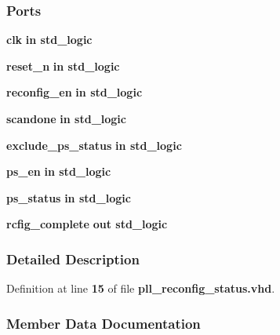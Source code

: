\subsubsection*{Ports}
 \begin{DoxyCompactItemize}
\item 
{\bf clk}  {\bfseries {\bfseries \textcolor{keywordflow}{in}\textcolor{vhdlchar}{ }}} {\bfseries \textcolor{comment}{std\+\_\+logic}\textcolor{vhdlchar}{ }} 
\item 
{\bf reset\+\_\+n}  {\bfseries {\bfseries \textcolor{keywordflow}{in}\textcolor{vhdlchar}{ }}} {\bfseries \textcolor{comment}{std\+\_\+logic}\textcolor{vhdlchar}{ }} 
\item 
{\bf reconfig\+\_\+en}  {\bfseries {\bfseries \textcolor{keywordflow}{in}\textcolor{vhdlchar}{ }}} {\bfseries \textcolor{comment}{std\+\_\+logic}\textcolor{vhdlchar}{ }} 
\item 
{\bf scandone}  {\bfseries {\bfseries \textcolor{keywordflow}{in}\textcolor{vhdlchar}{ }}} {\bfseries \textcolor{comment}{std\+\_\+logic}\textcolor{vhdlchar}{ }} 
\item 
{\bf exclude\+\_\+ps\+\_\+status}  {\bfseries {\bfseries \textcolor{keywordflow}{in}\textcolor{vhdlchar}{ }}} {\bfseries \textcolor{comment}{std\+\_\+logic}\textcolor{vhdlchar}{ }} 
\item 
{\bf ps\+\_\+en}  {\bfseries {\bfseries \textcolor{keywordflow}{in}\textcolor{vhdlchar}{ }}} {\bfseries \textcolor{comment}{std\+\_\+logic}\textcolor{vhdlchar}{ }} 
\item 
{\bf ps\+\_\+status}  {\bfseries {\bfseries \textcolor{keywordflow}{in}\textcolor{vhdlchar}{ }}} {\bfseries \textcolor{comment}{std\+\_\+logic}\textcolor{vhdlchar}{ }} 
\item 
{\bf rcfig\+\_\+complete}  {\bfseries {\bfseries \textcolor{keywordflow}{out}\textcolor{vhdlchar}{ }}} {\bfseries \textcolor{comment}{std\+\_\+logic}\textcolor{vhdlchar}{ }} 
\end{DoxyCompactItemize}


\subsubsection{Detailed Description}


Definition at line {\bf 15} of file {\bf pll\+\_\+reconfig\+\_\+status.\+vhd}.



\subsubsection{Member Data Documentation}
